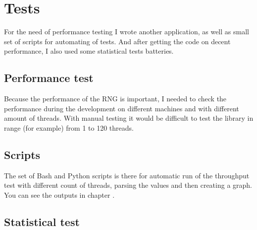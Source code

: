 
\section{Tests} \label{sec:tests}
For the need of performance testing I wrote another application, as well as small set of scripts for automating of tests. And after getting the code on decent performance, I also used some statistical tests batteries.

\subsection{Performance test}
Because the performance of the RNG is important, I needed to check the performance during the development on different machines and with different amount of threads. With manual testing it would be difficult to test the library in range (for example) from 1 to 120 threads.

\subsection{Scripts}
The set of Bash and Python scripts is there for automatic run of the throughput test with different count of threads, parsing the values and then creating a graph. You can see the outputs in chapter .

\subsection{Statistical test}


